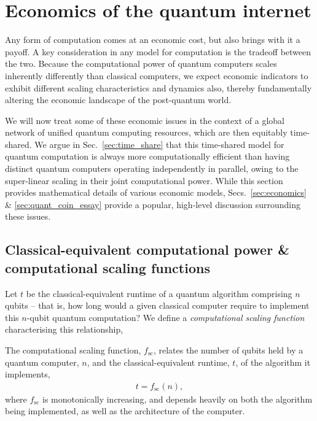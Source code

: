 %
%

\section{Economics of the quantum internet} 

Any form of computation comes at an economic cost, but also brings with it a payoff. A key consideration in any model for computation is the tradeoff between the two. Because the computational power of quantum computers scales inherently differently than classical computers, we expect economic indicators to exhibit different scaling characteristics and dynamics also, thereby fundamentally altering the economic landscape of the post-quantum world.

We will now treat some of these economic issues in the context of a global network of unified quantum computing resources, which are then equitably time-shared. We argue in Sec.~\ref{sec:time_share} that this time-shared model for quantum computation is always more computationally efficient than having distinct quantum computers operating independently in parallel, owing to the super-linear scaling in their joint computational power. While this section provides mathematical details of various economic models, Secs.~\ref{sec:economics} \& \ref{sec:quant_coin_essay} provide a popular, high-level discussion surrounding these issues.

%
%

\subsection{Classical-equivalent computational power \& computational scaling functions}

Let $t$ be the classical-equivalent runtime of a quantum algorithm comprising $n$ qubits -- that is, how long would a given classical computer require to implement this $n$-qubit quantum computation? We define a \textit{computational scaling function} characterising this relationship,

\begin{definition} \label{def:scaling_func} 
The computational scaling function, $f_\text{sc}$, relates the number of qubits held by a quantum computer, $n$, and the classical-equivalent runtime, $t$, of the algorithm it implements,
\begin{align}
t = f_\text{sc}(n),
\end{align}
	where $f_\text{sc}$ is monotonically increasing, and depends heavily on both the algorithm being implemented, as well as the architecture of the computer.
\end{definition}

